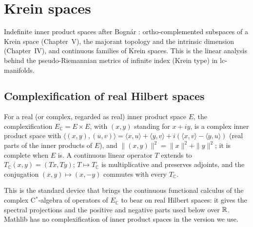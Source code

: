 \chapter{Krein spaces}
\label{chap:krein}

Indefinite inner product spaces after Bognár \cite{Bog74}: ortho-complemented subspaces of a Krein
space (Chapter~V), the majorant topology and the intrinsic dimension (Chapter~IV), and continuous
families of Krein spaces. This is the linear analysis behind the pseudo-Riemannian metrics of
infinite index (Krein type) in lc-manifolds.

\section{Complexification of real Hilbert spaces}

\begin{definition}
  \label{def:kr-complexification}
  \leanok
  For a real (or complex, regarded as real) inner product space $E$, the complexification
  $E_{\mathbb{C}} = E \times E$, with $(x, y)$ standing for $x + iy$, is a complex inner product
  space with
  $\langle (x, y), (u, v)\rangle = \langle x, u\rangle + \langle y, v\rangle
  + i(\langle x, v\rangle - \langle y, u\rangle)$ (real parts of the inner products of $E$), and
  $\|(x, y)\|^2 = \|x\|^2 + \|y\|^2$; it is complete when $E$ is. A continuous linear operator $T$
  extends to $T_{\mathbb{C}}(x, y) = (Tx, Ty)$; $T \mapsto T_{\mathbb{C}}$ is multiplicative and
  preserves adjoints, and the conjugation $(x, y) \mapsto (x, -y)$ commutes with every
  $T_{\mathbb{C}}$.
\end{definition}

This is the standard device that brings the continuous functional calculus of the complex
C$^*$-algebra of operators of $E_{\mathbb{C}}$ to bear on real Hilbert spaces: it gives the
spectral projections and the positive and negative parts used below over $\mathbb{R}$. Mathlib has no
complexification of inner product spaces in the version we use.

